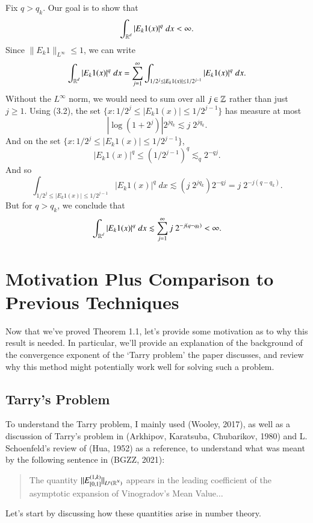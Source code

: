

\renewcommand\thesection{}



Fix $q > q_k$. Our goal is to show that
%
\[ \int_{\operatorname{\mathbb{R}}^d} |E_k 1(x)|^q\; dx < \infty. \]
%
Since $\| E_k 1 \|_{L^\infty} \leq 1$, we can write
%
\[ \int_{\operatorname{\mathbb{R}}^d} |E_k 1(x)|^q\; dx = \sum_{j = 1}^\infty \int_{1/2^j \leq |E_k 1(x)| \leq 1/2^{j-1}} |E_k 1(x)|^q\; dx. \]
%
Without the $L^\infty$ norm, we would need to sum over all $j \in \operatorname{\mathbb{Z}}$ rather than just $j \geq 1$. Using (3.2), the set $\{ x : 1/2^j \leq |E_k 1(x)| \leq 1/2^{j-1} \}$ has measure at most
%
\[ |\log(1 + 2^j)| 2^{jq_k} \lesssim j\; 2^{jq_k}. \]
%
And on the set $\{ x : 1/2^j \leq |E_k 1(x)| \leq 1/2^{j-1} \}$,
%
\[ |E_k 1(x)|^q \leq (1/2^{j-1})^q \lesssim_q 2^{-qj}. \]
%
And so
%
\[ \int_{1/2^j \leq |E_k 1(x)| \leq 1/2^{j-1}} |E_k 1(x)|^q\; dx \lesssim (j\; 2^{jq_k}) 2^{-qj} = j\; 2^{-j(q - q_k)}. \]
%
But for $q > q_k$, we conclude that
%
\[ \int_{\operatorname{\mathbb{R}}^d} |E_k 1(x)|^q\; dx \lesssim \sum_{j = 1}^\infty j\; 2^{-j(q - q_k)} < \infty. \]

\chapter*{Motivation Plus Comparison to Previous Techniques}

	Now that we've proved Theorem 1.1, let's provide some motivation as to why this result is needed. In particular, we'll provide an explanation of the background of the convergence exponent of the `Tarry problem' the paper discusses, and review why this method might potentially work well for solving such a problem.

	\section{Tarry's Problem}

	To understand the Tarry problem, I mainly used (Wooley, 2017), as well as a discussion of Tarry's problem in (Arkhipov, Karatsuba, Chubarikov, 1980) and L. Schoenfeld's review of (Hua, 1952) as a reference, to understand what was meant by the following sentence in (BGZZ, 2021):
	\begin{quote}
		The quantity $\| E_{[0,1]}^{(1,k)} \|_{L^p(\operatorname{\mathbb{R}}^N)}$ appears in the leading coefficient of the asymptotic expansion of Vinogradov's Mean Value$\dots$
	\end{quote}
	Let's start by discussing how these quantities arise in number theory.

